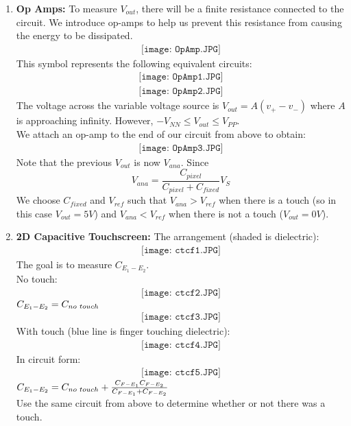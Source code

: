 \documentclass[10pt]{article}
\begin{document}
\begin{multicols}{2}
\begin{enumerate}
    \item \textbf{Op Amps:}
    To measure $V_{out}$, there will be a finite resistance connected to the circuit. We introduce op-amps to help us prevent this resistance from causing the energy to be dissipated. 
    \begin{align*}
        \texttt{[image: OpAmp.JPG]}
     \end{align*}
     This symbol represents the following equivalent circuits:
    \begin{align*}
        \texttt{[image: OpAmp1.JPG]}
     \end{align*}
    \begin{align*}
        \texttt{[image: OpAmp2.JPG]}
     \end{align*}
    The voltage across the variable voltage source is $V_{out}=A(v_+-v_-)$ where $A$ is approaching infinity. However, $-V_{NN} \leq V_{out} \leq V_{PP}$. \\
    We attach an op-amp to the end of our circuit from above to obtain:
    \begin{align*}
        \texttt{[image: OpAmp3.JPG]}
     \end{align*}
     Note that the previous $V_{out}$ is now $V_{ana}$. Since
    \begin{equation*}
        V_{ana}=\frac{C_{pixel}}{C_{pixel}+C_{fixed}}V_S
    \end{equation*}
    We choose $C_{fixed}$ and $V_{ref}$ such that $V_{ana} > V_{ref}$ when there is a touch (so in this case $V_{out}=5V$) and $V_{ana} < V_{ref}$ when there is not a touch ($V_{out} =0V$).
    
    \item \textbf{2D Capacitive Touchscreen:}
    The arrangement (shaded is dielectric):
    \begin{align*}
        \texttt{[image: ctcf1.JPG]}
     \end{align*}
     The goal is to measure $C_{E_1-E_2}$. \\
    No touch:
    \begin{align*}
        \texttt{[image: ctcf2.JPG]}
     \end{align*}
   $C_{E_1-E_2} = C_{no \hspace{1 mm} touch}$ 
    \begin{align*}
        \texttt{[image: ctcf3.JPG]}
     \end{align*}
    With touch (blue line is finger touching dielectric):
    \begin{align*}
        \texttt{[image: ctcf4.JPG]}
     \end{align*}
    In circuit form:
    \begin{align*}
        \texttt{[image: ctcf5.JPG]}
     \end{align*}
    $C_{E_1-E_2} = C_{no \hspace{1 mm} touch}+\frac{C_{F-E_1}C_{F-E_2}}{C_{F-E_1}+C_{F-E_2}}$ \\[6 pt]
    Use the same circuit from above to determine whether or not there was a touch.
    

\end{enumerate}
\end{multicols}
\end{document}
